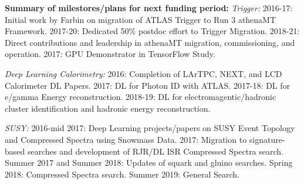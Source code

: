 
{\bf Summary of milestores/plans for next funding period:} {\em Trigger:}
2016-17: Initial work by Farbin on migration of ATLAS Trigger to Run 3
athenaMT Framework.  2017-20: Dedicated 50\% postdoc effort to Trigger
Migration. 2018-21: Direct contributions and leadership in athenaMT
migration, commissioning, and operation.  2017: GPU Demonstrator in
TensorFlow Study.

{\em Deep Learning Calorimetry:} 2016: Completion of LArTPC, NEXT, and LCD
Calorimeter DL Papers. 2017: DL for Photon ID with ATLAS. 2017-18: DL
for e/gamma Energy reconstruction. 2018-19: DL for
electromagentic/hadronic cluster identification and hadronic energy
reconstruction.



{\em SUSY:} 2016-mid 2017: Deep Learning projects/papers on SUSY Event
Topology and Compressed Spectra using Snowmass Data. 2017: Migration
to signature-based searches and development of RJR/DL ISR Compressed
Spectra search. Summer 2017 and Summer 2018: Updates of squark and
gluino searches. Spring 2018: Compressed Spectra search. Summer 2019:
General Search.

